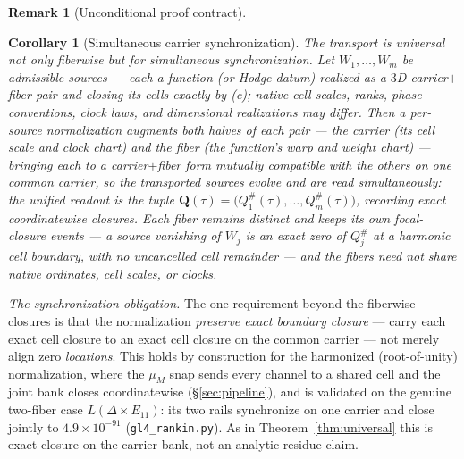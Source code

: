 \documentclass[11pt]{article}
\newtheorem{corollary}[theorem]{Corollary}
\theoremstyle{definition}
\newtheorem{remark}[theorem]{Remark}
\begin{document}
\begin{remark}[Unconditional proof contract]
\begin{enumerate}
\begin{corollary}[Simultaneous carrier synchronization]\label{cor:sync}
The transport is universal not only fiberwise but for \emph{simultaneous synchronization}. Let $W_1,\dots,W_m$ be
admissible sources --- each a function (or Hodge datum) realized as a $3$D carrier$+$fiber pair and closing its
cells exactly by \textup{(c)}; native cell scales, ranks, phase conventions, clock laws, and dimensional
realizations may differ. Then a per-source \emph{normalization} augments \emph{both} halves of each pair --- the
carrier (its cell scale and clock chart) and the fiber (the function's warp and weight chart) --- bringing each to
a carrier$+$fiber form mutually compatible with the others on one common carrier, so the transported sources
evolve and are read \emph{simultaneously}: the unified readout is the tuple
$\mathbf Q(\tau)=\big(Q_1^\#(\tau),\dots,Q_m^\#(\tau)\big)$, recording exact coordinatewise closures. Each fiber
remains distinct and keeps its own focal-closure events --- a source vanishing of $W_j$ is an exact zero of
$Q_j^\#$ at a harmonic cell boundary, with no uncancelled cell remainder --- and the fibers need not share native
ordinates, cell scales, or clocks.
\end{corollary}

\emph{The synchronization obligation.} The one requirement beyond the fiberwise closures is that the
normalization \emph{preserve exact boundary closure} --- carry each exact cell closure to an exact cell closure on
the common carrier --- not merely align zero \emph{locations}. This holds by construction for the harmonized
(root-of-unity) normalization, where the $\mu_M$ snap sends every channel to a shared cell and the joint bank
closes coordinatewise (\S\ref{sec:pipeline}), and is validated on the genuine two-fiber case $L(\Delta\times
E_{11})$: its two rails synchronize on one carrier and close jointly to $4.9\times10^{-91}$
(\texttt{gl4\_rankin.py}). As in Theorem~\ref{thm:universal} this is exact closure on the carrier bank, not an
analytic-residue claim.


\end{enumerate}
\end{remark}
\end{document}

